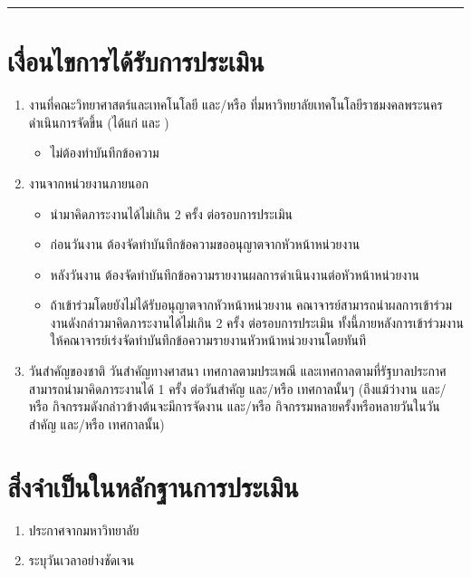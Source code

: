 \documentclass[a4paper,12pt,english]{sphinxmanual}
\begin{document}
\bigskip\hrule\bigskip



\section{เงื่อนไขการได้รับการประเมิน}
\label{\detokenize{4culture:id2}}\begin{enumerate}
%
\item {} 
งานที่คณะวิทยาศาสตร์และเทคโนโลยี และ/หรือ ที่มหาวิทยาลัยเทคโนโลยีราชมงคลพระนครดำเนินการจัดขึ้น (ได้แก่ {\hyperref[\detokenize{4culture:id4}]{}} และ {\hyperref[\detokenize{4culture:id13}]{}})
\begin{itemize}
\item {} 
ไม่ต้องทำบันทึกข้อความ

\end{itemize}

\item {} 
งานจากหน่วยงานภายนอก
\begin{itemize}
\item {} 
นำมาคิดภาระงานได้ไม่เกิน 2 ครั้ง ต่อรอบการประเมิน

\item {} 
ก่อนวันงาน ต้องจัดทำบันทึกข้อความขออนุญาตจากหัวหน้าหน่วยงาน

\item {} 
หลังวันงาน ต้องจัดทำบันทึกข้อความรายงานผลการดำเนินงานต่อหัวหน้าหน่วยงาน

\item {} 
ถ้าเข้าร่วมโดยยังไม่ได้รับอนุญาตจากหัวหน้าหน่วยงาน คณาจารย์สามารถนำผลการเข้าร่วมงานดังกล่าวมาคิดภาระงานได้ไม่เกิน 2 ครั้ง ต่อรอบการประเมิน ทั้งนี้ภายหลังการเข้าร่วมงานให้คณาจารย์เร่งจัดทำบันทึกข้อความรายงานหัวหน้าหน่วยงานโดยทันที

\end{itemize}

\item {} 
วันสำคัญของชาติ วันสำคัญทางศาสนา เทศกาลตามประเพณี และเทศกาลตามที่รัฐบาลประกาศ สามารถนำมาคิดภาระงานได้ 1 ครั้ง ต่อวันสำคัญ และ/หรือ เทศกาลนั้นๆ (ถึงแม้ว่างาน และ/หรือ กิจกรรมดังกล่าวข้างต้นจะมีการจัดงาน และ/หรือ กิจกรรมหลายครั้งหรือหลายวันในวันสำคัญ และ/หรือ เทศกาลนั้น)

\end{enumerate}


\section{สิ่งจำเป็นในหลักฐานการประเมิน}
\label{\detokenize{4culture:id3}}\begin{enumerate}
%
\item {} 
ประกาศจากมหาวิทยาลัย

\item {} 
ระบุวันเวลาอย่างชัดเจน

\end{enumerate}
\end{document}
